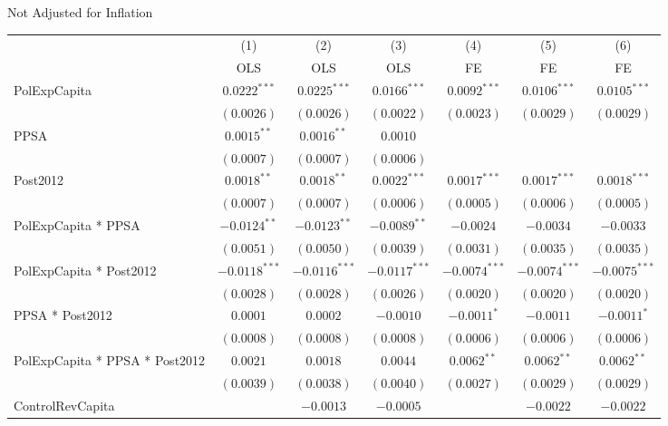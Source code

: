 \begin{table}[H]
    \centering
    \scriptsize
    \begin{minipage}{\textwidth}
    \centering
    {\normalsize Not Adjusted for Inflation}
    \vspace{6pt}
    \begin{tabular}{lcccccc}
        \toprule
         & (1) & (2) & (3) & (4) & (5) & (6) \\
         & OLS & OLS & OLS & FE & FE & FE \\
        \midrule
        PolExpCapita & $0.0222^{***}$ & $0.0225^{***}$ & $0.0166^{***}$ & $0.0092^{***}$ & $0.0106^{***}$ & $0.0105^{***}$ \\
         & $(0.0026)$ & $(0.0026)$ & $(0.0022)$ & $(0.0023)$ & $(0.0029)$ & $(0.0029)$ \\[4pt]
        PPSA & $0.0015^{**}$ & $0.0016^{**}$ & $0.0010$ &  &  &  \\
         & $(0.0007)$ & $(0.0007)$ & $(0.0006)$ &  &  &  \\[4pt]
        Post2012 & $0.0018^{**}$ & $0.0018^{**}$ & $0.0022^{***}$ & $0.0017^{***}$ & $0.0017^{***}$ & $0.0018^{***}$ \\
         & $(0.0007)$ & $(0.0007)$ & $(0.0006)$ & $(0.0005)$ & $(0.0006)$ & $(0.0005)$ \\[4pt]
        PolExpCapita * PPSA & $-0.0124^{**}$ & $-0.0123^{**}$ & $-0.0089^{**}$ & $-0.0024$ & $-0.0034$ & $-0.0033$ \\
         & $(0.0051)$ & $(0.0050)$ & $(0.0039)$ & $(0.0031)$ & $(0.0035)$ & $(0.0035)$ \\[4pt]
        PolExpCapita * Post2012 & $-0.0118^{***}$ & $-0.0116^{***}$ & $-0.0117^{***}$ & $-0.0074^{***}$ & $-0.0074^{***}$ & $-0.0075^{***}$ \\
         & $(0.0028)$ & $(0.0028)$ & $(0.0026)$ & $(0.0020)$ & $(0.0020)$ & $(0.0020)$ \\[4pt]
        PPSA * Post2012 & $0.0001$ & $0.0002$ & $-0.0010$ & $-0.0011^{*}$ & $-0.0011$ & $-0.0011^{*}$ \\
         & $(0.0008)$ & $(0.0008)$ & $(0.0008)$ & $(0.0006)$ & $(0.0006)$ & $(0.0006)$ \\[4pt]
        PolExpCapita * PPSA * Post2012 & $0.0021$ & $0.0018$ & $0.0044$ & $0.0062^{**}$ & $0.0062^{**}$ & $0.0062^{**}$ \\
         & $(0.0039)$ & $(0.0038)$ & $(0.0040)$ & $(0.0027)$ & $(0.0029)$ & $(0.0029)$ \\[4pt]
        ControlRevCapita &  & $-0.0013$ & $-0.0005$ &  & $-0.0022$ & $-0.0022$ \\

\end{tabular}
\end{minipage}
\end{table}
